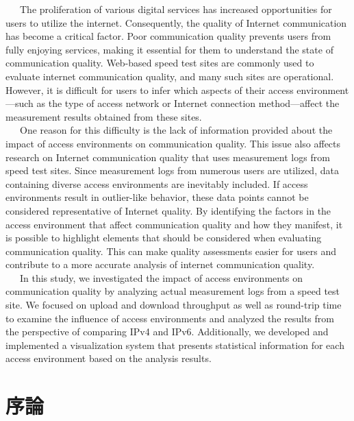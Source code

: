 \documentclass[12pt]{mthesis_utf8}
\begin{document}
\begin{eabstract}
~~~The proliferation of various digital services has increased opportunities for users to utilize the internet. Consequently, the quality of Internet communication has become a critical factor. Poor communication quality prevents users from fully enjoying services, making it essential for them to understand the state of communication quality. Web-based speed test sites are commonly used to evaluate internet communication quality, and many such sites are operational. However, it is difficult for users to infer which aspects of their access environment—such as the type of access network or Internet connection method—affect the measurement results obtained from these sites.\\
~~~One reason for this difficulty is the lack of information provided about the impact of access environments on communication quality. This issue also affects research on Internet communication quality that uses measurement logs from speed test sites. Since measurement logs from numerous users are utilized, data containing diverse access environments are inevitably included. If access environments result in outlier-like behavior, these data points cannot be considered representative of Internet quality. By identifying the factors in the access environment that affect communication quality and how they manifest, it is possible to highlight elements that should be considered when evaluating communication quality. This can make quality assessments easier for users and contribute to a more accurate analysis of internet communication quality.\\
~~~In this study, we investigated the impact of access environments on communication quality by analyzing actual measurement logs from a speed test site. We focused on upload and download throughput as well as round-trip time to examine the influence of access environments and analyzed the results from the perspective of comparing IPv4 and IPv6. Additionally, we developed and implemented a visualization system that presents statistical information for each access environment based on the analysis results.
\end{eabstract}



\chapter{序論}
\end{document}
